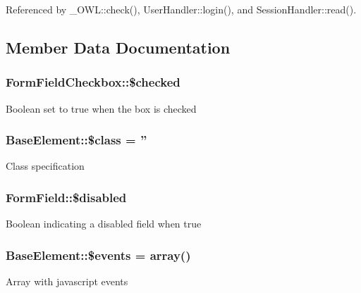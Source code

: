 Referenced by \_\-OWL::check(), UserHandler::login(), and SessionHandler::read().



\subsection{Member Data Documentation}
\subsubsection[{\$checked}]{\setlength{\rightskip}{0pt plus 5cm}FormFieldCheckbox::\$checked}\label{classFormFieldCheckbox_a4abeb3a9445b5f31e84e32d257037f2a}
Boolean set to true when the box is checked 
\subsubsection[{\$class}]{\setlength{\rightskip}{0pt plus 5cm}BaseElement::\$class = ''}\label{classBaseElement_a99976a8e967db92e7800309f359b0803}
Class specification 
\subsubsection[{\$disabled}]{\setlength{\rightskip}{0pt plus 5cm}FormField::\$disabled}\label{classFormField_ab6f1907061890290e32cb2befc0a5f50}
Boolean indicating a disabled field when true 
\subsubsection[{\$events}]{\setlength{\rightskip}{0pt plus 5cm}BaseElement::\$events = array()}\label{classBaseElement_a02cebe45d277b4ff8f29db08bad371ba}
Array with javascript events 

